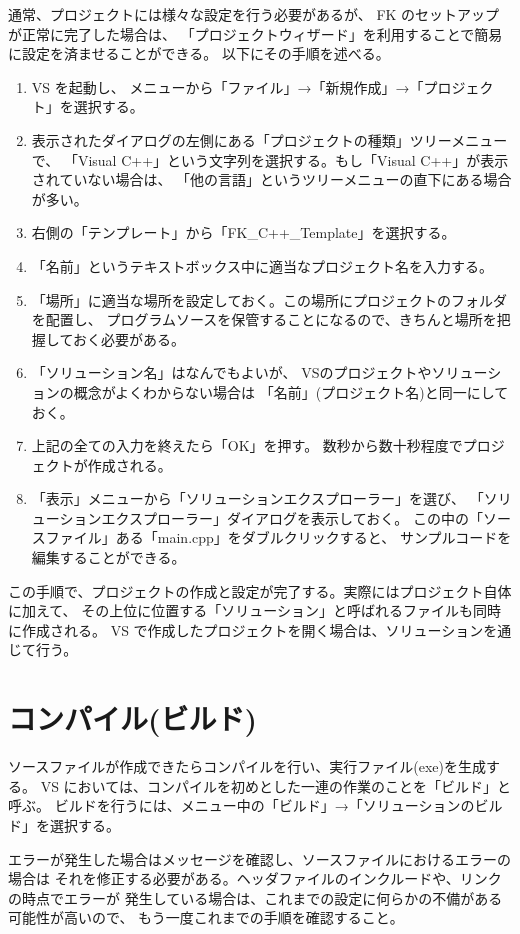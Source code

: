 \documentclass[a4j]{jarticle}
\begin{document}
通常、プロジェクトには様々な設定を行う必要があるが、
FK のセットアップが正常に完了した場合は、
「プロジェクトウィザード」を利用することで簡易に設定を済ませることができる。
以下にその手順を述べる。

\begin{enumerate}
 \item VS を起動し、
	メニューから「ファイル」→「新規作成」→「プロジェクト」を選択する。
 \item 表示されたダイアログの左側にある「プロジェクトの種類」ツリーメニューで、
	「Visual C++」という文字列を選択する。もし「Visual C++」が表示されていない場合は、
	「他の言語」というツリーメニューの直下にある場合が多い。
 \item 右側の「テンプレート」から「FK\_C++\_Template」を選択する。
 \item 「名前」というテキストボックス中に適当なプロジェクト名を入力する。
 \item 「場所」に適当な場所を設定しておく。この場所にプロジェクトのフォルダを配置し、
	プログラムソースを保管することになるので、きちんと場所を把握しておく必要がある。
 \item 「ソリューション名」はなんでもよいが、
	VSのプロジェクトやソリューションの概念がよくわからない場合は
	「名前」(プロジェクト名)と同一にしておく。
 \item 上記の全ての入力を終えたら「OK」を押す。
	数秒から数十秒程度でプロジェクトが作成される。
 \item 「表示」メニューから「ソリューションエクスプローラー」を選び、
	「ソリューションエクスプローラー」ダイアログを表示しておく。
	この中の「ソースファイル」ある「main.cpp」をダブルクリックすると、
	サンプルコードを編集することができる。
\end{enumerate}

この手順で、プロジェクトの作成と設定が完了する。実際にはプロジェクト自体に加えて、
その上位に位置する「ソリューション」と呼ばれるファイルも同時に作成される。
VS で作成したプロジェクトを開く場合は、ソリューションを通じて行う。

\section{コンパイル(ビルド)}
ソースファイルが作成できたらコンパイルを行い、実行ファイル(exe)を生成する。
VS においては、コンパイルを初めとした一連の作業のことを「ビルド」と呼ぶ。
ビルドを行うには、メニュー中の「ビルド」→「ソリューションのビルド」を選択する。

エラーが発生した場合はメッセージを確認し、ソースファイルにおけるエラーの場合は
それを修正する必要がある。ヘッダファイルのインクルードや、リンクの時点でエラーが
発生している場合は、これまでの設定に何らかの不備がある可能性が高いので、
もう一度これまでの手順を確認すること。
\end{document}

